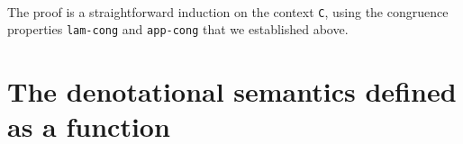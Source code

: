 \begin{fence}
\begin{code}
\AgdaSpace{}%
\AgdaSymbol{\}}\AgdaSpace{}%
\AgdaSpace{}%
\AgdaSymbol{=}\<%
\\
\>[0][@{}l@{\AgdaIndent{0}}]%
\>[2]\AgdaSpace{}%
\AgdaSymbol{(}\AgdaSpace{}%
\AgdaSymbol{\{}\AgdaSpace{}%
\AgdaSymbol{=}\AgdaSpace{}%
\AgdaSymbol{\}}\AgdaSpace{}%
\AgdaSymbol{)}\AgdaSpace{}%
\AgdaSpace{}%
\AgdaSpace{}%
\AgdaSpace{}%
\AgdaSpace{}%
\AgdaSpace{}%
\AgdaSpace{}%
\AgdaSpace{}%
\AgdaSpace{}%
\AgdaSymbol{)}\AgdaSpace{}%
\AgdaOperator{\AgdaInductiveConstructor{,}}\AgdaSpace{}%
\AgdaSpace{}%
\AgdaSpace{}%
\AgdaSpace{}%
\AgdaSymbol{)}\AgdaSpace{}%
\<%
\\
\>[0]\AgdaSpace{}%
\AgdaSymbol{\{}\AgdaSpace{}%
\AgdaSymbol{=}\AgdaSpace{}%
\AgdaSpace{}%
\AgdaSpace{}%
\AgdaSymbol{\}}\AgdaSpace{}%
\AgdaSpace{}%
\AgdaSymbol{=}\<%
\\
\>[0][@{}l@{\AgdaIndent{0}}]%
\>[2]\AgdaSpace{}%
\AgdaSpace{}%
\AgdaSpace{}%
\AgdaSpace{}%
\AgdaSpace{}%
\AgdaSpace{}%
\AgdaSpace{}%
\AgdaSpace{}%
\AgdaSpace{}%
\AgdaSymbol{)}\AgdaSpace{}%
\AgdaOperator{\AgdaInductiveConstructor{,}}\AgdaSpace{}%
\AgdaSpace{}%
\AgdaSpace{}%
\AgdaSpace{}%
\AgdaSymbol{)}\AgdaSpace{}%
\AgdaSymbol{)}\AgdaSpace{}%
\AgdaSymbol{(}\AgdaSpace{}%
\AgdaSymbol{\{}\AgdaSpace{}%
\AgdaSymbol{=}\AgdaSpace{}%
\AgdaSymbol{\}}\AgdaSpace{}%
\AgdaSymbol{)}\<%
\end{code}
\end{fence}

The proof is a straightforward induction on the context \texttt{C},
using the congruence properties \texttt{lam-cong} and \texttt{app-cong}
that we established above.

\hypertarget{the-denotational-semantics-defined-as-a-function}{%
\section{The denotational semantics defined as a
function}\label{the-denotational-semantics-defined-as-a-function}}

